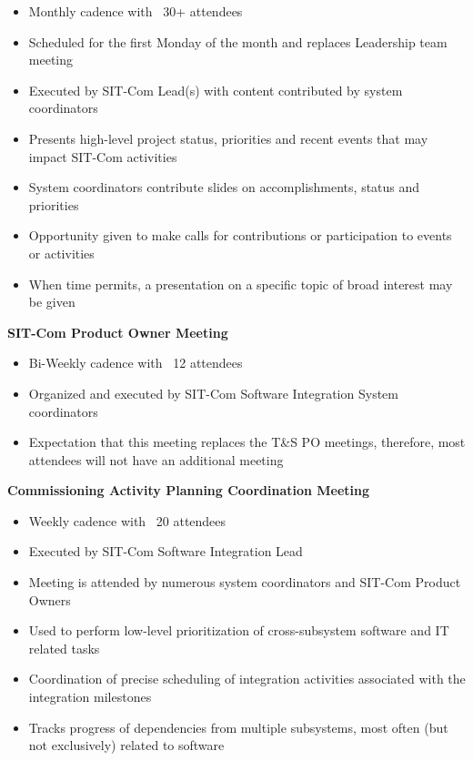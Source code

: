 \documentclass[SE,lsstdraft,authoryear,toc]{lsstdoc}
\begin{document}
\begin{itemize}
    \item Monthly cadence with ~30+ attendees
    \item Scheduled for the first Monday of the month and replaces Leadership team meeting
    \item Executed by SIT-Com Lead(s) with content contributed by system coordinators
    \item Presents high-level project status, priorities and recent events that may impact SIT-Com activities
    \item System coordinators contribute slides on accomplishments, status and priorities
    \item Opportunity given to make calls for contributions or participation to events or activities
    \item When time permits, a presentation on a specific topic of broad interest may be given
\end{itemize}

\textbf{SIT-Com Product Owner Meeting}
\begin{itemize}
    \item Bi-Weekly cadence with ~12 attendees
    \item Organized and executed by SIT-Com Software Integration System coordinators
    \item Expectation that this meeting replaces the T\&S PO meetings, therefore, most attendees will not have an additional meeting
\end{itemize}


\textbf{Commissioning Activity Planning Coordination Meeting}
\begin{itemize}
    \item Weekly cadence with ~20 attendees
    \item Executed by SIT-Com Software Integration Lead
    \item Meeting is attended by numerous system coordinators and SIT-Com Product Owners
    \item Used to perform low-level prioritization of cross-subsystem software and IT related tasks
    \item Coordination of precise scheduling of  integration activities associated with the integration milestones
    \item Tracks progress of dependencies from multiple subsystems, most often (but not exclusively) related to software
\end{itemize}
\end{document}
